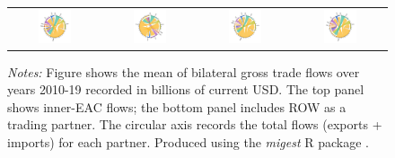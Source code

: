 \documentclass[a4paper]{article}
\begin{document}
\begin{figure}[h!]
{\begin{tabular}{cccc}
\includegraphics[width=0.4\textwidth, trim= {0.85cm 0.8cm 1cm 1cm}, clip]{"BACI_MIG_2010_19_ROW.pdf"} & \includegraphics[width=0.4\textwidth, trim= {0.8cm 0.8cm 1cm 1cm}, clip]{"DOT_MIG_2010_19_ROW.pdf"} &
\includegraphics[width=0.4\textwidth, trim= {1cm 0.8cm 0.9cm 1cm}, clip]{"EORA_MIG_2010_19_ROW.pdf"} &
\includegraphics[width=0.4\textwidth, trim= {0.8cm 0.8cm 1cm 1cm}, clip]{"EM_MIG_2010_19_ROW.pdf"}
\end{tabular}
}
\raggedright
\scriptsize 
\emph{Notes:} Figure shows the mean of bilateral gross trade flows over years 2010-19 recorded in billions of current USD. The top panel shows inner-EAC flows; the bottom panel includes ROW as a trading partner. The circular axis records the total flows (exports + imports) for each partner. Produced using the \emph{migest} R package \citep{rmigest}.
\end{figure}
\FloatBarrier
\end{document}

